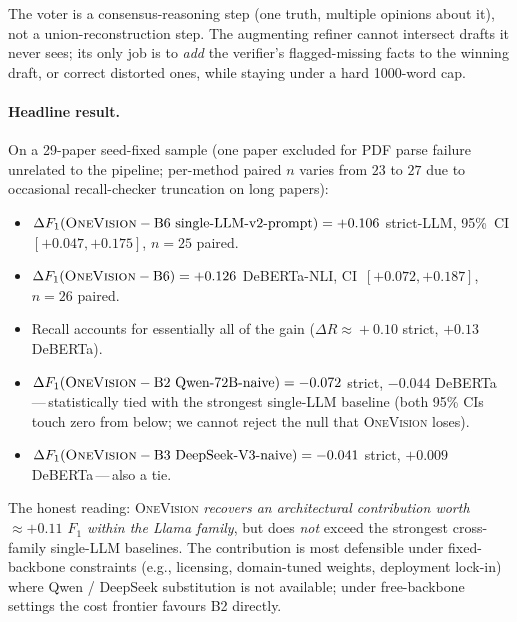 \documentclass[11pt,a4paper]{article}
\begin{document}
The voter is a consensus-reasoning step (one truth, multiple
opinions about it), not a union-reconstruction step. The augmenting
refiner cannot intersect drafts it never sees; its only job is to
\emph{add} the verifier's flagged-missing facts to the winning draft,
or correct distorted ones, while staying under a hard 1000-word cap.

\paragraph{Headline result.}
On a 29-paper seed-fixed sample (one paper excluded for PDF parse
failure unrelated to the pipeline; per-method paired $n$ varies
from $23$ to $27$ due to occasional recall-checker truncation on
long papers):

\begin{itemize}[leftmargin=*,topsep=2pt,itemsep=2pt]
    \item $\Delta F_1(\textsc{OneVision} - \text{B6 single-LLM-v2-prompt})
          = +0.106$ strict-LLM, 95\%~CI $[+0.047, +0.175]$, $n=25$ paired.
    \item $\Delta F_1(\textsc{OneVision} - \text{B6}) = +0.126$ DeBERTa-NLI,
          CI~$[+0.072, +0.187]$, $n=26$ paired.
    \item Recall accounts for essentially all of the gain
          ($\Delta R \!\approx\! +0.10$ strict, $+0.13$ DeBERTa).
    \item $\Delta F_1(\textsc{OneVision} - \text{B2 Qwen-72B-naive})
          = -0.072$ strict, $-0.044$ DeBERTa\,---\,statistically tied
          with the strongest single-LLM baseline (both 95\% CIs
          touch zero from below; we cannot reject the null that
          \textsc{OneVision} loses).
    \item $\Delta F_1(\textsc{OneVision} - \text{B3 DeepSeek-V3-naive})
          = -0.041$ strict, $+0.009$ DeBERTa\,---\,also a tie.
\end{itemize}

\noindent The honest reading: \textsc{OneVision} \emph{recovers an
architectural contribution worth $\approx +0.11$ $F_1$ within the
Llama family}, but does \emph{not} exceed the strongest cross-family
single-LLM baselines. The contribution is most defensible under
fixed-backbone constraints (e.g., licensing, domain-tuned weights,
deployment lock-in) where Qwen / DeepSeek substitution is not
available; under free-backbone settings the cost frontier favours
B2 directly.
\end{document}
